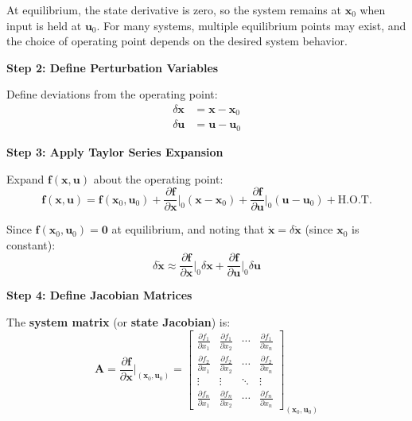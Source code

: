At equilibrium, the state derivative is zero, so the system remains at $\mathbf{x}_0$ when input is held at $\mathbf{u}_0$. For many systems, multiple equilibrium points may exist, and the choice of operating point depends on the desired system behavior.

\textbf{Step 2: Define Perturbation Variables}

Define deviations from the operating point:
\begin{align}
\delta\mathbf{x} &= \mathbf{x} - \mathbf{x}_0 \label{eq:delta_x} \\
\delta\mathbf{u} &= \mathbf{u} - \mathbf{u}_0 \label{eq:delta_u}
\end{align}

\textbf{Step 3: Apply Taylor Series Expansion}

Expand $\mathbf{f}(\mathbf{x}, \mathbf{u})$ about the operating point:
\begin{equation}
\mathbf{f}(\mathbf{x}, \mathbf{u}) = \mathbf{f}(\mathbf{x}_0, \mathbf{u}_0) + \frac{\partial \mathbf{f}}{\partial \mathbf{x}}\bigg|_0 (\mathbf{x} - \mathbf{x}_0) + \frac{\partial \mathbf{f}}{\partial \mathbf{u}}\bigg|_0 (\mathbf{u} - \mathbf{u}_0) + \text{H.O.T.}
\end{equation}

Since $\mathbf{f}(\mathbf{x}_0, \mathbf{u}_0) = \mathbf{0}$ at equilibrium, and noting that $\dot{\mathbf{x}} = \delta\dot{\mathbf{x}}$ (since $\mathbf{x}_0$ is constant):
\begin{equation}
\delta\dot{\mathbf{x}} \approx \frac{\partial \mathbf{f}}{\partial \mathbf{x}}\bigg|_0 \delta\mathbf{x} + \frac{\partial \mathbf{f}}{\partial \mathbf{u}}\bigg|_0 \delta\mathbf{u}
\end{equation}

\textbf{Step 4: Define Jacobian Matrices}

The \textbf{system matrix} (or \textbf{state Jacobian}) is:
\begin{equation}
\mathbf{A} = \frac{\partial \mathbf{f}}{\partial \mathbf{x}}\bigg|_{(\mathbf{x}_0, \mathbf{u}_0)} =
\begin{bmatrix}
\frac{\partial f_1}{\partial x_1} & \frac{\partial f_1}{\partial x_2} & \cdots & \frac{\partial f_1}{\partial x_n} \\
\frac{\partial f_2}{\partial x_1} & \frac{\partial f_2}{\partial x_2} & \cdots & \frac{\partial f_2}{\partial x_n} \\
\vdots & \vdots & \ddots & \vdots \\
\frac{\partial f_n}{\partial x_1} & \frac{\partial f_n}{\partial x_2} & \cdots & \frac{\partial f_n}{\partial x_n}
\end{bmatrix}_{(\mathbf{x}_0, \mathbf{u}_0)}
\label{eq:A_matrix}
\end{equation}

